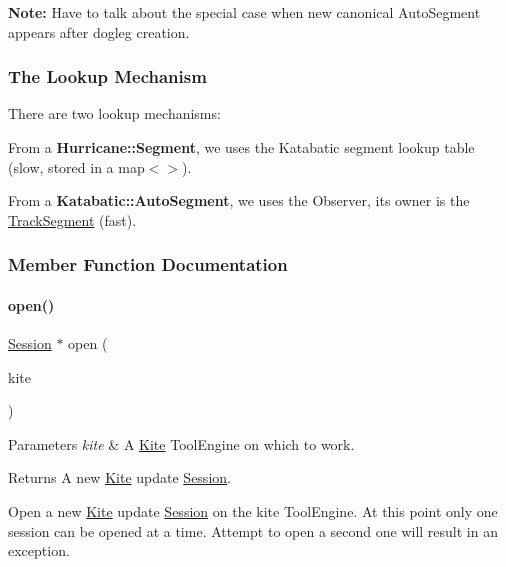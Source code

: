 {\bfseries Note\+:} Have to talk about the special case when new canonical Auto\+Segment appears after dogleg creation.\hypertarget{classKite_1_1Session_secKiteSessionLookup}{}\subsubsection{The Lookup Mechanism}\label{classKite_1_1Session_secKiteSessionLookup}
There are two lookup mechanisms\+:
\begin{DoxyItemize}
\item From a \textbf{ Hurricane\+::\+Segment}, we uses the Katabatic segment lookup table (slow, stored in a {\ttfamily map$<$$>$}).
\item From a \textbf{ Katabatic\+::\+Auto\+Segment}, we uses the Observer, it\textquotesingle{}s owner is the \hyperlink{classKite_1_1TrackSegment}{Track\+Segment} (fast). 
\end{DoxyItemize}

\subsubsection{Member Function Documentation}
\mbox{\label{classKite_1_1Session_ab8362982a442b5a67f5bd76d6b6caf93}} 
\paragraph{\texorpdfstring{open()}{open()}}
{\footnotesize\ttfamily \hyperlink{classKite_1_1Session}{Session} $\ast$ open (\begin{DoxyParamCaption}\item[{\hyperlink{classKite_1_1KiteEngine}{Kite\+Engine} $\ast$}]{kite }\end{DoxyParamCaption})\hspace{0.3cm}{\ttfamily [static]}}


\begin{DoxyParams}{Parameters}
{\em kite} & A \hyperlink{namespaceKite}{Kite} Tool\+Engine on which to work. \\
\hline
\end{DoxyParams}
\begin{DoxyReturn}{Returns}
A new \hyperlink{namespaceKite}{Kite} update \hyperlink{classKite_1_1Session}{Session}.
\end{DoxyReturn}
Open a new \hyperlink{namespaceKite}{Kite} update \hyperlink{classKite_1_1Session}{Session} on the {\ttfamily kite} {\ttfamily Tool\+Engine}. At this point only one session can be opened at a time. Attempt to open a second one will result in an exception. \mbox{\label{classKite_1_1Session_a76f17c3642eaeba85fa0af5ae9d208b4}} 
